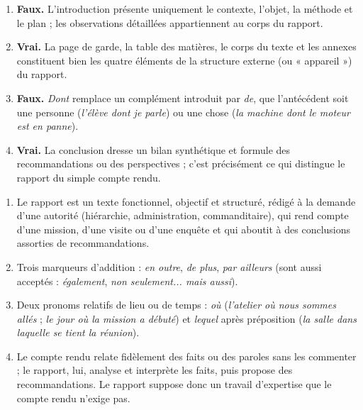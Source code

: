 \documentclass[11pt]{article}
\newcommand{\cle}[1]{{\popxbold\color{popdark}#1}}
\begin{document}
\begin{corrige}
\begin{enumerate}
    \item \textbf{Faux.} L'introduction présente uniquement le contexte, l'objet, la méthode et le plan ; les observations détaillées appartiennent au corps du rapport.
    \item \textbf{Vrai.} La page de garde, la table des matières, le corps du texte et les annexes constituent bien les quatre éléments de la structure externe (ou « appareil ») du rapport.
    \item \textbf{Faux.} \emph{Dont} remplace un complément introduit par \emph{de}, que l'antécédent soit une personne (\emph{l'élève dont je parle}) ou une chose (\emph{la machine dont le moteur est en panne}).
    \item \textbf{Vrai.} La conclusion dresse un bilan synthétique et formule des recommandations ou des perspectives ; c'est précisément ce qui distingue le rapport du simple compte rendu.
\end{enumerate}
\end{corrige}

\begin{corrige}
\begin{enumerate}
    \item Le \cle{rapport} est un texte fonctionnel, objectif et structuré, rédigé à la demande d'une autorité (hiérarchie, administration, commanditaire), qui rend compte d'une mission, d'une visite ou d'une enquête et qui aboutit à des conclusions assorties de recommandations.
    \item Trois marqueurs d'addition : \emph{en outre}, \emph{de plus}, \emph{par ailleurs} (sont aussi acceptés : \emph{également}, \emph{non seulement... mais aussi}).
    \item Deux pronoms relatifs de lieu ou de temps : \emph{où} (\emph{l'atelier où nous sommes allés} ; \emph{le jour où la mission a débuté}) et \emph{lequel} après préposition (\emph{la salle dans laquelle se tient la réunion}).
    \item Le \cle{compte rendu} relate fidèlement des faits ou des paroles sans les commenter ; le \cle{rapport}, lui, analyse et interprète les faits, puis propose des recommandations. Le rapport suppose donc un travail d'expertise que le compte rendu n'exige pas.
\end{enumerate}
\end{corrige}
\end{document}
